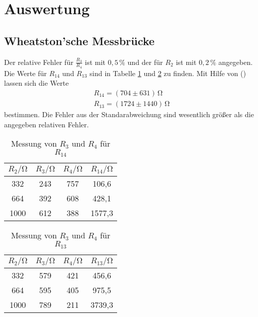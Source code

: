 \section{Auswertung}
\label{sec:Auswertung}

\subsection{Wheatston'sche Messbrücke}
Der relative Fehler für $\frac{R_3}{R_4}$ ist mit $0,5\,\%$ und der für $R_2$ ist mit $0,2\,\%$ angegeben. Die Werte für $R_{14}$ und $R_{13}$ sind in
Tabelle \ref{tab:R14} und \ref{tab:R13} zu finden. Mit Hilfe von () lassen sich die Werte
\begin{gather*}
  R_{14} = (704 \pm 631)\,\unit{\ohm} \\
  R_{13} = (1724 \pm 1440)\,\unit{\ohm}
\end{gather*}
bestimmen. Die Fehler aus der Standarabweichung sind wesentlich größer als die angegeben relativen Fehler.

\begin{table}
  \centering
  \caption{Messung von $R_3$ und $R_4$ für $R_{14}$}
  \label{tab:R14}
  \begin{tabular}{c c c c}
    \toprule
    $R_2/\unit{\ohm}$ & $R_3/\unit{\ohm}$ & $R_4/\unit{\ohm}$ & $R_{14}/\unit{\ohm}$ \\
    \midrule
     332 & 243 & 757 &  106,6 \\
     664 & 392 & 608 &  428,1 \\
    1000 & 612 & 388 & 1577,3 \\
    \bottomrule
  \end{tabular}
\end{table}

\begin{table}
  \centering
  \caption{Messung von $R_3$ und $R_4$ für $R_{13}$}
  \label{tab:R13}
  \begin{tabular}{c c c c}
    \toprule
    $R_2/\unit{\ohm}$ & $R_3/\unit{\ohm}$ & $R_4/\unit{\ohm}$ & $R_{13}/\unit{\ohm}$ \\
    \midrule
     332 & 579 & 421 &  456,6 \\
     664 & 595 & 405 &  975,5 \\
    1000 & 789 & 211 & 3739,3 \\
    \bottomrule
  \end{tabular}
\end{table}

